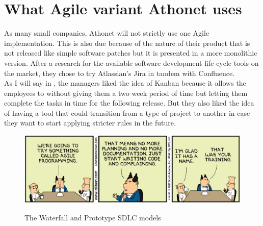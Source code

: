 \section{What Agile variant Athonet uses}
	As many small companies, Athonet will not strictly use one Agile implementation.
	This is also due because of the nature of their product that is not released like simple software patches but it is presented in a more monolithic version.
	After a research for the available software development life-cycle tools on the market, they chose to try Atlassian's Jira in tandem with Confluence.\\
	As I will say in , the managers liked the idea of Kanban because it allows the employees to  without giving them a two week period of time but letting them complete the tasks in time for the following release.
	But they also liked the idea of having a tool that could transition from a type of project to another in case they want to start applying stricter rules in the future.
	\begin{figure}[H]
		\centering
		\includegraphics[width=\textwidth]{resources/Dilbert_Training_Agile_Programming}\\
		\caption{The Waterfall and Prototype SDLC models}
	\end{figure}

